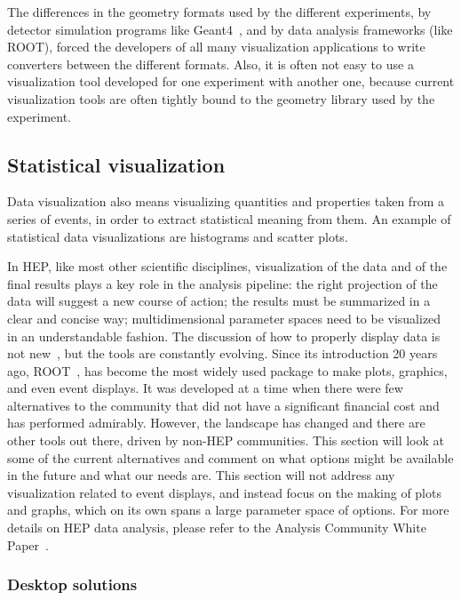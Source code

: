 \documentclass[12pt,a4paper]{article}
\begin{document}
The differences in the geometry formats used by the different experiments, by detector simulation programs like Geant4~\cite{Geant4},
and by data analysis frameworks (like ROOT), forced the developers of all many visualization applications to write converters
between the different formats. Also, it is often not easy to use a visualization tool developed for one experiment with another one,
because current visualization tools are often tightly bound to the geometry library used by the experiment.

\hypertarget{statistical-visualization}{%
\subsection{Statistical visualization}\label{statistical-visualization}}

Data visualization also means visualizing quantities and properties taken from a series of events, in order to extract statistical
meaning from them. An example of statistical data visualizations are histograms and scatter plots.

In HEP, like most other scientific disciplines, visualization of the data and of the final results plays a key role in the
analysis pipeline: the right projection of the data will suggest a new course of action; the results must be summarized in a
clear and concise way; multidimensional parameter spaces need to be visualized in an understandable fashion. The discussion
of how to properly display data is not new~\cite{Tufte1986}, but the tools are constantly evolving. Since its introduction 20 years ago,
ROOT~\cite{Root1997}, has become the most widely used package to make plots, graphics, and even event displays. It was developed at a
time when there were few alternatives to the community that did not have a significant financial cost and has performed admirably.
However, the landscape has changed and there are other tools out there, driven by non-HEP communities. This section will look at
some of the current alternatives and comment on what options might be available in the future and what our needs are. This section
will not address any visualization related to event displays, and instead focus on the making of plots and graphs, which on its own
spans a large parameter space of options. For more details on HEP data analysis, please refer to the Analysis Community White Paper~\cite{hsf-cwp-analysis}.

\hypertarget{stats-desktop}{%
\subsubsection{Desktop solutions}\label{stats-desktop}}
\end{document}
